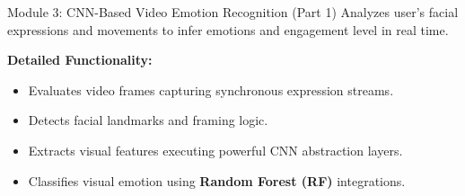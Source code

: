 \documentclass[11pt]{beamer}
\begin{document}
\begin{frame}{Module 3: CNN-Based Video Emotion Recognition (Part 1)}
Analyzes user’s facial expressions and movements to infer emotions and engagement level in real time.

\vspace{0.3cm}
\textbf{Detailed Functionality:}
\begin{itemize}
    \item Evaluates video frames capturing synchronous expression streams.
    \item Detects facial landmarks and framing logic.
    \item Extracts visual features executing powerful CNN abstraction layers.
    \item Classifies visual emotion using \textbf{Random Forest (RF)} integrations.
\end{itemize}
\end{frame}
\end{document}

